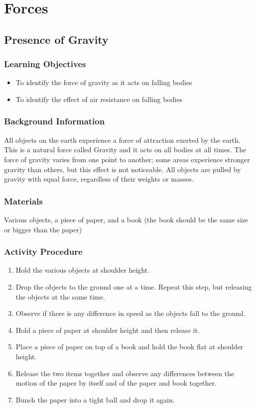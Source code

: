 \section{Forces}


\subsection{Presence of Gravity}

\subsubsection*{Learning Objectives}
\begin{itemize}
\item{To identify the force of gravity as it acts on falling bodies} 
\item{To identify the effect of air resistance on falling bodies} 
\end{itemize}

\subsubsection*{Background Information}
All objects on the earth experience a force of attraction exerted by the earth.  This is a natural force called Gravity and it acts on all bodies at all times.  The force of gravity varies from one point to another; some areas experience stronger gravity than others, but this effect is not noticeable.  All objects are pulled by gravity with equal force, regardless of their weights or masses.

\subsubsection*{Materials}
Various objects, a piece of paper, and a book (the book should be the same size or bigger than the paper)

\subsubsection*{Activity Procedure}
\begin{enumerate}
\item{Hold the various objects at shoulder height.} 
\item{Drop the objects to the ground one at a time. Repeat this step, but releasing the objects at the same time.} 
\item{Observe if there is any difference in speed as the objects fall to the ground.} 
\item{Hold a piece of paper at shoulder height and then release it.} 
\item{Place a piece of paper on top of a book and hold the book flat at shoulder height.} 
\item{Release the two items together and observe any differences between the motion of the paper by itself and of the paper and book together.} 
\item{Bunch the paper into a tight ball and drop it again.}
\end{enumerate}

